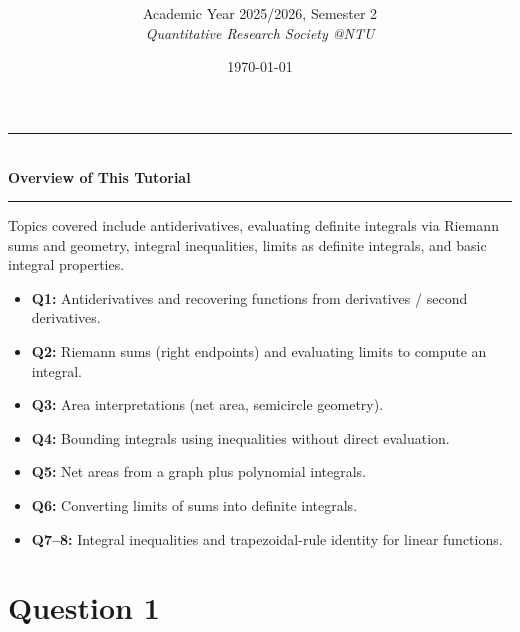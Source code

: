 \documentclass[12pt]{article}
\title{
\CourseCode \CourseName \\[0.3em]
\large \DocType
}
\author{
  Academic Year 2025/2026, Semester 2 \\[0.25em]
  \textit{Quantitative Research Society @NTU}
}
\date{\today}
\begin{document}

\maketitle
\thispagestyle{plainfirst}
\pagestyle{main}

\bigskip


\begin{center}
\rule{0.8\textwidth}{0.4pt}\\[4pt]
\textbf{Overview of This Tutorial}\\[2pt]
\rule{0.8\textwidth}{0.4pt}
\end{center}

\noindent
Topics covered include antiderivatives, evaluating definite integrals via Riemann sums and geometry, integral inequalities, limits as definite integrals, and basic integral properties.

\begin{itemize}[leftmargin=*]
\item \textbf{Q1:} Antiderivatives and recovering functions from derivatives / second derivatives.
\item \textbf{Q2:} Riemann sums (right endpoints) and evaluating limits to compute an integral.
\item \textbf{Q3:} Area interpretations (net area, semicircle geometry).
\item \textbf{Q4:} Bounding integrals using inequalities without direct evaluation.
\item \textbf{Q5:} Net areas from a graph plus polynomial integrals.
\item \textbf{Q6:} Converting limits of sums into definite integrals.
\item \textbf{Q7--8:} Integral inequalities and trapezoidal-rule identity for linear functions.
\end{itemize}

\bigskip


\newpage

\section*{Question 1}
\end{document}
